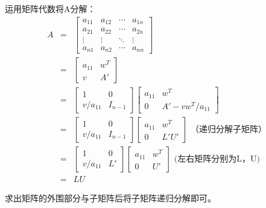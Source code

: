 运用矩阵代数将A分解：
\begin{eqnarray*}
	A&=&\left[\begin{array}{c|ccc}
			a_{11} & a_{12} & \cdots & a_{1n} \\
			\hline
			a_{21} & a_{22} & \cdots & a_{2n} \\
			\vdots & \vdots & \ddots & \vdots \\
			a_{n1} & a_{n2} & \cdots & a_{nn}
        \end{array} \right]\\
    &=&\left[\begin{array}{cc}
        a_{11}&w^T\\
        v&A'
    \end{array}\right]\\
    &=&\left[\begin{array}{cc}
        1&0\\
        v/a_{11}&I_{n-1}
    \end{array}\right]
    \left[\begin{array}{cc}
        a_{11}&w^T\\
        0&A'-vw^T/a_{11}
    \end{array}\right]\\
    &=&\left[\begin{array}{cc}
        1&0\\
        v/a_{11}&I_{n-1}
    \end{array}\right]
    \left[\begin{array}{cc}
        a_{11}&w^T\\
        0&L'U'
    \end{array}\right] \textrm{~（递归分解子矩阵）}\\
    &=&\left[\begin{array}{cc}
        1&0\\
        v/a_{11}&L'
    \end{array}\right]
    \left[\begin{array}{cc}
        a_{11}&w^T\\
        0&U'
    \end{array}\right]\textrm{~(左右矩阵分别为L，U)}\\
    &=&LU
\end{eqnarray*}

求出矩阵的外围部分与子矩阵后将子矩阵递归分解即可。

